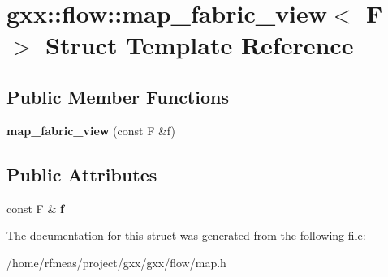 \hypertarget{structgxx_1_1flow_1_1map__fabric__view}{}\section{gxx\+:\+:flow\+:\+:map\+\_\+fabric\+\_\+view$<$ F $>$ Struct Template Reference}
\label{structgxx_1_1flow_1_1map__fabric__view}
\subsection*{Public Member Functions}
\begin{DoxyCompactItemize}
\item 
{\bfseries map\+\_\+fabric\+\_\+view} (const F \&f)\hypertarget{structgxx_1_1flow_1_1map__fabric__view_ae468821ae9aef305e7e3818c324a0879}{}\label{structgxx_1_1flow_1_1map__fabric__view_ae468821ae9aef305e7e3818c324a0879}

\end{DoxyCompactItemize}
\subsection*{Public Attributes}
\begin{DoxyCompactItemize}
\item 
const F \& {\bfseries f}\hypertarget{structgxx_1_1flow_1_1map__fabric__view_aa998bfcc47d385217c599d0896876730}{}\label{structgxx_1_1flow_1_1map__fabric__view_aa998bfcc47d385217c599d0896876730}

\end{DoxyCompactItemize}


The documentation for this struct was generated from the following file\+:\begin{DoxyCompactItemize}
\item 
/home/rfmeas/project/gxx/gxx/flow/map.\+h\end{DoxyCompactItemize}
